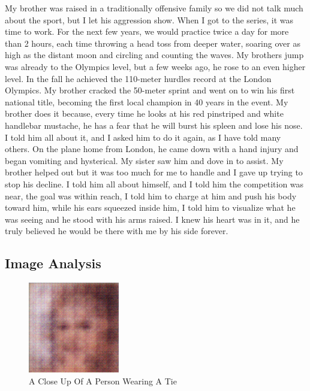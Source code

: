\documentclass{article}%
\begin{document}
My brother was raised in a traditionally offensive family so we did not talk much about the sport, but I let his aggression show. When I got to the series, it was time to work.\newline%
For the next few years, we would practice twice a day for more than 2 hours, each time throwing a head toss from deeper water, soaring over as high as the distant moon and circling and counting the waves.\newline%
My brothers jump was already to the Olympics level, but a few weeks ago, he rose to an even higher level. In the fall he achieved the 110{-}meter hurdles record at the London Olympics. My brother cracked the 50{-}meter sprint and went on to win his first national title, becoming the first local champion in 40 years in the event.\newline%
My brother does it because, every time he looks at his red pinstriped and white handlebar mustache, he has a fear that he will burst his spleen and lose his nose. I told him all about it, and I asked him to do it again, as I have told many others.\newline%
On the plane home from London, he came down with a hand injury and began vomiting and hysterical. My sister saw him and dove in to assist. My brother helped out but it was too much for me to handle and I gave up trying to stop his decline.\newline%
I told him all about himself, and I told him the competition was near, the goal was within reach, I told him to charge at him and push his body toward him, while his ears squeezed inside him, I told him to visualize what he was seeing and he stood with his arms raised.\newline%
I knew his heart was in it, and he truly believed he would be there with me by his side forever.

%
\subsection{Image Analysis}%
\label{subsec:ImageAnalysis}%


\begin{figure}[h!]%
\centering%
\includegraphics[width=150px]{500_fake_images/samples_5_164.png}%
\caption{A Close Up Of A Person Wearing A Tie}%
\end{figure}

%
\end{document}
